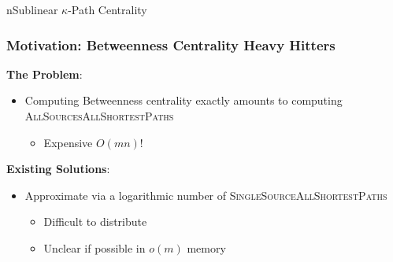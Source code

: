 \documentclass{beamer}
\newcommand{\algoname}[1]{\textnormal{\textsc{#1}}}
\begin{document}
n{Sublinear $\kappa$-Path Centrality}


\begin{frame}
\frametitle{Motivation: Betweenness Centrality Heavy Hitters}

\textbf{The Problem}:
\begin{itemize}
	\item Computing Betweenness centrality exactly amounts to computing \algoname{AllSourcesAllShortestPaths}
	\begin{itemize}
		\item Expensive $O(mn)$!
	\end{itemize}
\end{itemize}
\textbf{Existing Solutions}:
\begin{itemize}
	\item Approximate via a logarithmic number of \algoname{SingleSourceAllShortestPaths} \cite{green2012fast, bergamini2014approximating, yoshida2014almost, kourtellis2015scalable, riondato2016fast}
	\begin{itemize}
		\item Difficult to distribute
		\item Unclear if possible in $o(m)$ memory
	\end{itemize}
\end{itemize}


\end{frame}



\end{document}
